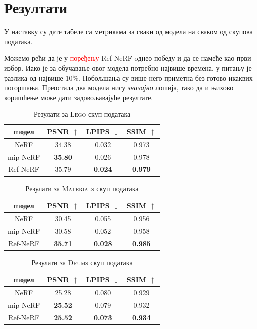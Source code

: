 \documentclass[12pt, a4paper, twoside]{book}
\numberwithin{equation}{chapter}
\numberwithin{theorem}{section}
\numberwithin{definition}{section}
\numberwithin{definitionChapter}{chapter}
\begin{document}
\section{Резултати}
У наставку су дате табеле са метрикама за сваки од модела на сваком од скупова података.

Можемо рећи да је у \textcolor{red}{поређењу} Ref-NeRF oднео победу и да се намеће као први избор. Иако је за обучавање овог модела потребно 
највише времена, у питању је разлика од највише 10\%. Побољшања су више него приметна без готово икаквих погоршања.
Преостала два модела нису \textit{значајно} лошија, тако да и њихово коришћење може дати задовољавајуће резултате.

	\begin{table}[H]
		\centering
		\begin{tabular}{cccc} \toprule
			{mодел}			& {PSNR $\uparrow$}	& {LPIPS $\downarrow$}	& {SSIM $\uparrow$} \\ \midrule
			{NeRF}			& 34.38				& 0.032					& 0.973 \\ 
			{mip-NeRF}		& \textbf{35.80}	& 0.026					& 0.978 \\
			{Ref-NeRF}		& 35.79				& \textbf{0.024}		& \textbf{0.979} \\ \bottomrule
		\end{tabular}
		\caption{Резулати за \textsc{Lego} скуп података}
		\label{table-lego}
	\end{table}

	\begin{table}[H]
		\centering
		\begin{tabular}{cccc} \toprule
			{mодел}			& {PSNR $\uparrow$} & {LPIPS $\downarrow$}	& {SSIM $\uparrow$} \\ \midrule
			{NeRF} 			& 30.45 			& 0.055					& 0.956 \\ 
			{mip-NeRF}		& 30.58 			& 0.052					& 0.958 \\
			{Ref-NeRF}		& \textbf{35.71}	& \textbf{0.028}		& \textbf{0.985} \\ \bottomrule
		\end{tabular}
		\caption{Резулати за \textsc{Materials} скуп података}
		\label{table-materials}
	\end{table}

	\begin{table}[H]
		\centering
		\begin{tabular}{cccc} \toprule
			{mодел}			& {PSNR $\uparrow$} & {LPIPS $\downarrow$}	& {SSIM $\uparrow$} \\ \midrule
			{NeRF}			& 25.28				& 0.080 				& 0.929 \\ 
			{mip-NeRF}		& \textbf{25.52}	& 0.079					& 0.932 \\
			{Ref-NeRF}		& \textbf{25.52}	& \textbf{0.073}		& \textbf{0.934} \\ \bottomrule
		\end{tabular}
		\caption{Резулати за \textsc{Drums} скуп података}
		\label{table-drums}
	\end{table}
\end{document}
